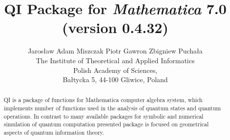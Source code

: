 \documentclass[a4paper,10pt]{scrartcl}
\begin{document}
\title{QI Package for \emph{Mathematica} 7.0 \\(version 0.4.32)}\author{Jaros{\l}aw Adam Miszczak \quad Piotr Gawron \quad Zbigniew Pucha{\l}a\\
{The Institute of Theoretical and Applied Informatics}\\
{Polish Academy of Sciences},\\
{Ba{\l}tycka 5, 44-100 Gliwice, Poland}}
\maketitle
\begin{abstract}QI is a package of functions for Mathematica computer algebra system, which implements number of functions used in the analysis of quantum states and quantum operations. In contrast to many available packages for symbolic and numerical simulation of quantum computation presented package is focused on geometrical aspects of quantum information theory.\end{abstract}

 
\end{document}

